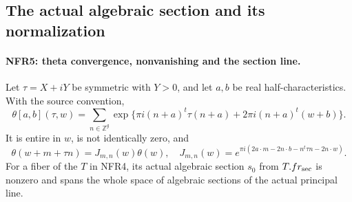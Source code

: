 \subsection{The actual algebraic section and its normalization}

\paragraph{NFR5: theta convergence, nonvanishing and the section line.}
\label{claim:NFR5}
Let $\tau=X+iY$ be symmetric with $Y>0$, and let $a,b$ be real
half-characteristics.  With the source convention,
\[
 \theta[a,b](\tau,w)=\sum_{n\in\mathbb Z^g}
   \exp\{\pi i(n+a)^t\tau(n+a)+2\pi i(n+a)^t(w+b)\}.
 \tag{NFR.11}
\]
It is entire in $w$, is not identically zero, and
\[
 \theta(w+m+\tau n)=J_{m,n}(w)\theta(w),\quad
 J_{m,n}(w)=e^{\pi i(2a\cdot m-2n\cdot b-n^t\tau n-2n\cdot w)}.
 \tag{NFR.12}
\]
For a fiber of the $T$ in NFR4, its actual algebraic section
$s_0$ from $T.fr_{\rm sec}$ is nonzero and spans the whole space
of algebraic sections of the actual principal line.

